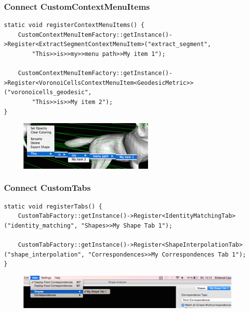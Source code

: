 \documentclass[compress]{beamer}
\begin{document}
\begin{frame}[fragile]
\frametitle{Connect CustomContextMenuItems}
\begin{lstlisting}
static void registerContextMenuItems() {
    CustomContextMenuItemFactory::getInstance()->Register<ExtractSegmentContextMenuItem>("extract_segment",
        "This>>is>>my>>menu path>>My item 1");
   
    CustomContextMenuItemFactory::getInstance()->Register<VoronoiCellsContextMenuItem<GeodesicMetric>>("voronoicells_geodesic",
        "This>>is>>My item 2");
}     
\end{lstlisting}
  \begin{figure}[h]
	\centering
	\includegraphics[width=0.60\textwidth]{menu.png}
\end{figure}
\end{frame}

\begin{frame}[fragile]
\frametitle{Connect CustomTabs}
\begin{lstlisting}
static void registerTabs() {
    CustomTabFactory::getInstance()->Register<IdentityMatchingTab>("identity_matching", "Shapes>>My Shape Tab 1");

    CustomTabFactory::getInstance()->Register<ShapeInterpolationTab>("shape_interpolation", "Correspondences>>My Correspondences Tab 1");
}
\end{lstlisting}
  \begin{figure}[h]
	\centering
	\includegraphics[width=\textwidth]{tabs.png}
\end{figure}
\end{frame}
\end{document}
